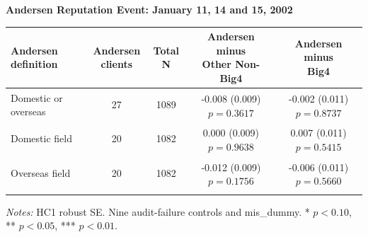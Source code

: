 \documentclass[10pt]{article}
\newcommand{\sym}[1]{\textsuperscript{#1}}
\begin{document}
\fontsize{10}{12}\selectfont\setlength{\parindent}{0pt}
\noindent\textbf{Andersen Reputation Event: January 11, 14 and 15, 2002}\par\medskip
\setlength{\tabcolsep}{3pt}\renewcommand{\arraystretch}{1.15}
\begin{tabular*}{\textwidth}{@{\extracolsep{\fill}}lcccc@{}}
\toprule
Andersen definition & \shortstack{Andersen\\clients} & Total N & \shortstack{Andersen minus\\Other Non-Big4} & \shortstack{Andersen minus\\Big4} \\
\midrule
Domestic or overseas & 27 & 1089 & \shortstack{-0.008\sym{}\\(0.009)\\$p=0.3617$} & \shortstack{-0.002\sym{}\\(0.011)\\$p=0.8737$} \\ \addlinespace
Domestic field & 20 & 1082 & \shortstack{0.000\sym{}\\(0.009)\\$p=0.9638$} & \shortstack{0.007\sym{}\\(0.011)\\$p=0.5415$} \\ \addlinespace
Overseas field & 20 & 1082 & \shortstack{-0.012\sym{}\\(0.009)\\$p=0.1756$} & \shortstack{-0.006\sym{}\\(0.011)\\$p=0.5660$} \\ \addlinespace
\bottomrule
\end{tabular*}
\par\medskip\fontsize{9}{11}\selectfont\textit{Notes:} HC1 robust SE. Nine audit-failure controls and mis\_dummy. * $p<0.10$, ** $p<0.05$, *** $p<0.01$.
\end{document}
